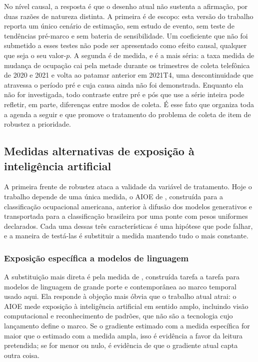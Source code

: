 No nível causal, a resposta é que o desenho atual não sustenta a afirmação, por
duas razões de natureza distinta. A primeira é de escopo: esta versão do
trabalho reporta um único cenário de estimação, sem estudo de evento, sem teste
de tendências pré-marco e sem bateria de sensibilidade. Um coeficiente que não
foi submetido a esses testes não pode ser apresentado como efeito causal,
qualquer que seja o seu valor-$p$. A segunda é de medida, e é a mais séria: a
taxa medida de mudança de ocupação cai pela metade durante os trimestres de
coleta telefônica de 2020 e 2021 e volta ao patamar anterior em 2021T4, uma descontinuidade que atravessa o
período pré e cuja causa ainda não foi demonstrada. Enquanto ela não for
investigada, todo contraste entre pré e pós que use a série inteira pode
refletir, em parte, diferenças entre modos de coleta. É esse fato
que organiza toda a agenda a seguir e que promove o tratamento do problema de
coleta de item de robustez a prioridade.

\subsection{Medidas alternativas de exposição à inteligência artificial}
\label{sec:exposicoes}

A primeira frente de robustez ataca a validade da variável de tratamento. Hoje
o trabalho depende de uma única medida, o AIOE de ,
construída para a classificação ocupacional americana, anterior à difusão dos
modelos generativos e transportada para a classificação brasileira por uma ponte
com pesos uniformes declarados. Cada uma dessas três características é uma
hipótese que pode falhar, e a maneira de testá-las é substituir a medida
mantendo tudo o mais constante.

\subsubsection{Exposição específica a modelos de linguagem}

A substituição mais direta é pela medida de ,
construída tarefa a tarefa para modelos de linguagem de grande porte e
contemporânea ao marco temporal usado aqui. Ela responde à objeção mais óbvia
que o trabalho atual atrai: o AIOE mede exposição à inteligência artificial em
sentido amplo, incluindo visão computacional e reconhecimento de padrões, que
não são a tecnologia cujo lançamento define o marco. Se o gradiente estimado com
a medida específica for maior que o estimado com a medida ampla, isso é evidência
a favor da leitura pretendida; se for menor ou nulo, é evidência de que o
gradiente atual capta outra coisa.

